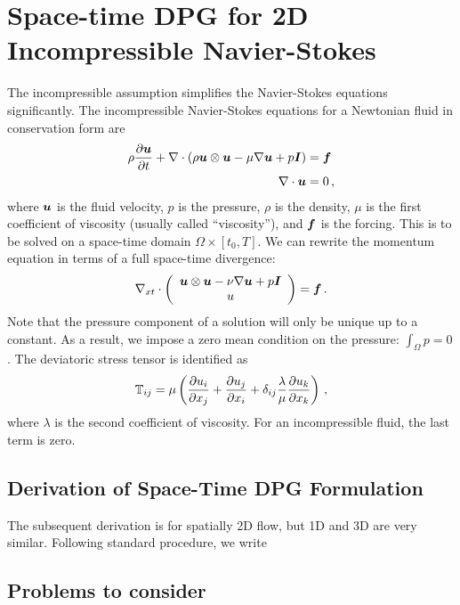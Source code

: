 \documentclass[Proposal.tex]{subfiles}
\begin{document}
\section{Space-time DPG for 2D Incompressible Navier-Stokes}
The incompressible assumption simplifies the Navier-Stokes equations significantly.
The incompressible Navier-Stokes equations for a Newtonian fluid in conservation form are
\begin{align*}
  \rho\frac{\partial\boldsymbol u}{\partial t}+\nabla\cdot\left( \rho\boldsymbol u\otimes\boldsymbol u-\mu\nabla\boldsymbol u+p\boldsymbol I \right)&=\boldsymbol f\\
  \nabla\cdot\boldsymbol u&=0\,,
\end{align*}
where $\boldsymbol u$ is the fluid velocity, $p$ is the pressure, $\rho$ is the density, $\mu$ is the first coefficient of viscosity (usually called ``viscosity''), 
and $\boldsymbol f$ is the forcing. 
This is to be solved on a space-time domain $\Omega\times[t_0,T]$.
We can rewrite the momentum equation in terms of a full space-time divergence:
\begin{equation}
\nabla_{xt}\cdot\left( \begin{array}{c} \boldsymbol u\otimes\boldsymbol u-\nu\nabla\boldsymbol u+p\boldsymbol I\\ u\\ \end{array} \right)=\boldsymbol f\,.
\end{equation}
Note that the pressure component of a solution will only be unique up to a constant. 
As a result, we impose a zero mean condition on the pressure: $\int_\Omega p=0$.
The deviatoric stress tensor is identified as
\begin{equation}
	\mathbb{T}_{ij}=\mu\left( \frac{\partial u_i}{\partial x_j}+\frac{\partial u_j}{\partial x_i}
	+\delta_{ij}\frac{\lambda}{\mu}\frac{\partial u_k}{\partial x_k} \right)\,,
\end{equation}
where $\lambda$ is the second coefficient of viscosity.
For an incompressible fluid, the last term is zero.

\subsection{Derivation of Space-Time DPG Formulation}
The subsequent derivation is for spatially 2D flow, but 1D and 3D are very similar.
Following standard procedure, we write

\subsection{Problems to consider}
\end{document}
